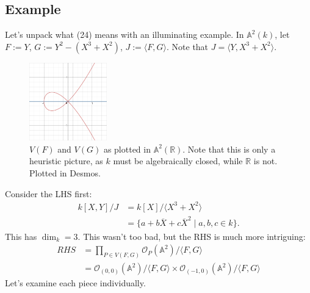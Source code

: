 \documentclass[12pt]{article}
\newcommand{\real}{\mathbb{R}}
\newcommand{\vbrack}[1]{\langle #1\rangle}
\theoremstyle{definition}
\begin{document}
\subsection{Example}
Let's unpack what (24) means with an illuminating example. In $\mathbb{A}^2(k)$, let $F:=Y$, $G:=Y^2-(X^3+X^2)$, $J:=\vbrack{F,G}$. Note that $J=\vbrack{Y,X^3+X^2}$.
\begin{figure}[H]
    \centering
    \includegraphics[width=0.3\textwidth]{17.png}
    \caption{$V(F)$ and $V(G)$ as plotted in $\mathbb{A}^2(\real)$. Note that this is only a heuristic picture, as $k$ must be algebraically closed, while $\real$ is not. Plotted in Desmos.}
\end{figure}
Consider the LHS first: 
\begin{align*}
    k[X,Y]/J&=k[X]/\vbrack{X^3+X^2}\\
    &=\{a+b\overline{X}+c\overline{X}^2\mid a,b,c\in k\}.
\end{align*}
This has $\dim_k=3$. This wasn't too bad, but the RHS is much more intriguing:
\begin{align*}
    RHS&=\prod\limits_{P\in V(F,G)}\mathcal{O}_P(\mathbb{A}^2)/\vbrack{F,G}\\
    &=\mathcal{O}_{(0,0)}(\mathbb{A}^2)/\vbrack{F,G}\times \mathcal{O}_{(-1,0)}(\mathbb{A}^2)/\vbrack{F,G}
\end{align*}
Let's examine each piece individually.
\end{document}
